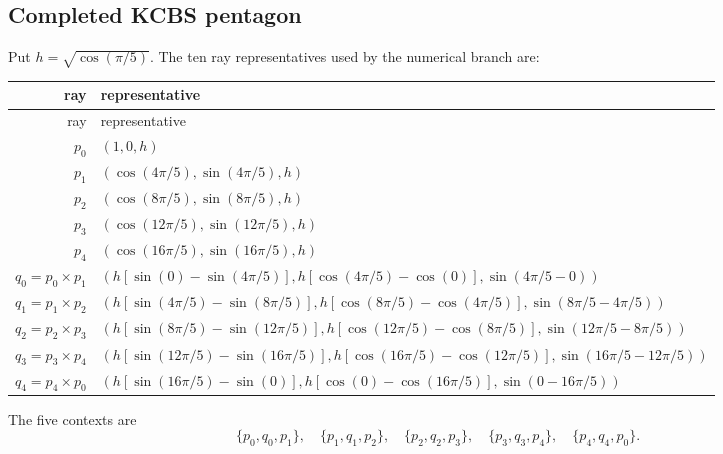 \subsection{Completed KCBS pentagon}
Put \(h=\sqrt{\cos(\pi/5)}\).  The ten ray representatives used by the numerical branch are:
\begin{longtable}{@{}r l@{}}
\toprule ray & representative\\ \midrule
\endfirsthead \toprule ray & representative\\ \midrule \endhead
$p_{0}$ & $(1,0,h)$\\
$p_{1}$ & $(\cos(4\pi/5),\sin(4\pi/5),h)$\\
$p_{2}$ & $(\cos(8\pi/5),\sin(8\pi/5),h)$\\
$p_{3}$ & $(\cos(12\pi/5),\sin(12\pi/5),h)$\\
$p_{4}$ & $(\cos(16\pi/5),\sin(16\pi/5),h)$\\
$q_{0}=p_{0}\mathbin{\times}p_{1}$ & $(h[\sin(0)-\sin(4\pi/5)],h[\cos(4\pi/5)-\cos(0)],\sin(4\pi/5-0))$\\
$q_{1}=p_{1}\mathbin{\times}p_{2}$ & $(h[\sin(4\pi/5)-\sin(8\pi/5)],h[\cos(8\pi/5)-\cos(4\pi/5)],\sin(8\pi/5-4\pi/5))$\\
$q_{2}=p_{2}\mathbin{\times}p_{3}$ & $(h[\sin(8\pi/5)-\sin(12\pi/5)],h[\cos(12\pi/5)-\cos(8\pi/5)],\sin(12\pi/5-8\pi/5))$\\
$q_{3}=p_{3}\mathbin{\times}p_{4}$ & $(h[\sin(12\pi/5)-\sin(16\pi/5)],h[\cos(16\pi/5)-\cos(12\pi/5)],\sin(16\pi/5-12\pi/5))$\\
$q_{4}=p_{4}\mathbin{\times}p_{0}$ & $(h[\sin(16\pi/5)-\sin(0)],h[\cos(0)-\cos(16\pi/5)],\sin(0-16\pi/5))$\\
\bottomrule
\end{longtable}
The five contexts are
\[
\{p_0,q_0,p_1\},\quad \{p_1,q_1,p_2\},\quad \{p_2,q_2,p_3\},
\quad \{p_3,q_3,p_4\},\quad \{p_4,q_4,p_0\}.
\]
